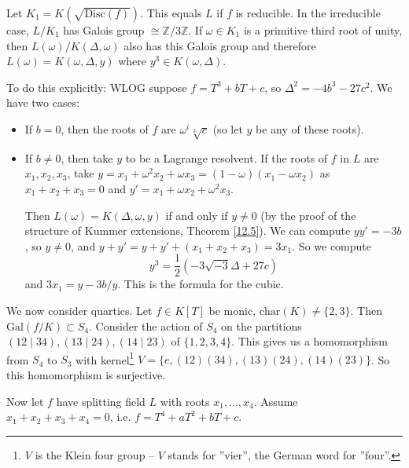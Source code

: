 \documentclass{article}
\theoremstyle{definition}
\begin{document}
Let $K_1 = K(\sqrt{\text{Disc}(f)})$. This equals $L$ if $f$ is reducible. In the irreducible case, $L/K_1$ has Galois group $\cong \mathbb{Z}/3\mathbb{Z}$. If $\omega \in K_1$ is a primitive third root of unity, then $L(\omega)/K(\Delta,\omega)$ also has this Galois group and therefore $L(\omega) = K(\omega,\Delta,y)$ where $y^3 \in K(\omega,\Delta)$.
\vspace{1mm}

To do this explicitly: WLOG suppose $f=T^3+bT+c$, so $\Delta^2 = -4b^3-27c^2$. We have two cases:
\begin{itemize}
    \item If $b=0$, then the roots of $f$ are $\omega^i \sqrt[3]{c}$ (so let $y$ be any of these roots).
    \item If $b\neq0$, then take $y$ to be a Lagrange resolvent. If the roots of $f$ in $L$ are $x_1,x_2,x_3$, take $y=x_1+\omega^2 x_2 + \omega x_3 = (1-\omega)(x_1 - \omega x_2)$ as $x_1+x_2+x_3=0$ and $y' = x_1 +\omega x_2 + \omega^2 x_3$. 
    \vspace{1mm}
    
    Then $L(\omega)=K(\Delta,\omega,y)$ if and only if $y \neq 0$ (by the proof of the structure of Kummer extensions, Theorem \ref{12.5}). We can compute $y y' = -3b$, so $y \neq 0$, and $y+y' = y + y' + (x_1+x_2+x_3) = 3x_1$. So we compute \[
    y^3 = \frac{1}{2}(-3\sqrt{-3}\Delta+27c)
    \]
    and $3x_1 = y -3b/y$. This is the formula for the cubic.
\end{itemize}
\vspace{1mm}

We now consider quartics. Let $f \in K[T]$ be monic, $\text{char}(K) \neq \{2,3\}$. Then $\text{Gal}(f/K) \subset S_4$. Consider the action of $S_4$ on the partitions $(12 \mid 34), (13 \mid 24), (14 \mid 23)$ of $\{1,2,3,4\}$. This gives us a homomorphism from $S_4$ to $S_3$ with kernel\footnote{$V$ is the Klein four group -- $V$ stands for ''vier'', the German word for ''four''.} $V= \{e,(12)(34),(13)(24),(14)(23)\}$. So this homomorphism is surjective.
\vspace{1mm} 

Now let $f$ have splitting field $L$ with roots $x_1,\ldots,x_4$. Assume $x_1+x_2+x_3+x_4=0$, i.e. $f=T^4+aT^2+bT+c$.
\end{document}
